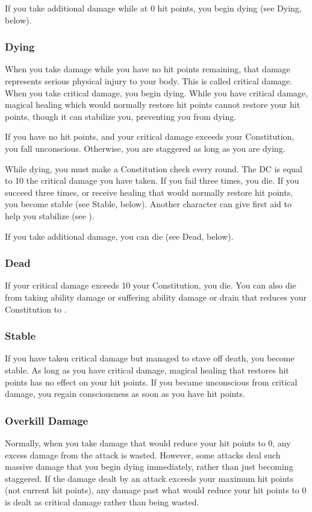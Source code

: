 If you take additional damage while at 0 hit points, you begin dying (see Dying, below).

\subsubsection{Dying}\label{Dying}
When you take damage while you have no hit points remaining, that damage represents serious physical injury to your body. This is called critical damage. When you take critical damage, you begin dying. While you have critical damage, magical healing which would normally restore hit points cannot restore your hit points, though it can stabilize you, preventing you from dying.

If you have no hit points, and your critical damage exceeds your Constitution, you fall unconscious. Otherwise, you are staggered as long as you are dying.

While dying, you must make a Constitution check every round. The DC is equal to 10 \add the critical damage you have taken. If you fail three times, you die. If you succeed three times, or receive healing that would normally restore hit points, you become stable (see Stable, below). Another character can give first aid to help you stabilize (see ).

If you take additional damage, you can die (see Dead, below).

\subsubsection{Dead}
If your critical damage exceeds 10 \add your Constitution, you die. You can also die from taking ability damage or suffering ability damage or drain that reduces your Constitution to .

\subsubsection{Stable}\label{Stable}
If you have taken critical damage but managed to stave off death, you become stable. As long as you have critical damage, magical healing that restores hit points has no effect on your hit points. If you became unconscious from critical damage, you regain consciousness as soon as you have hit points.

\subsubsection{Overkill Damage}
Normally, when you take damage that would reduce your hit points to 0, any excess damage from the attack is wasted. However, some attacks deal such massive damage that you begin dying immediately, rather than just becoming staggered. If the damage dealt by an attack exceeds your maximum hit points (not current hit points), any damage past what would reduce your hit points to 0 is dealt as critical damage rather than being wasted.

